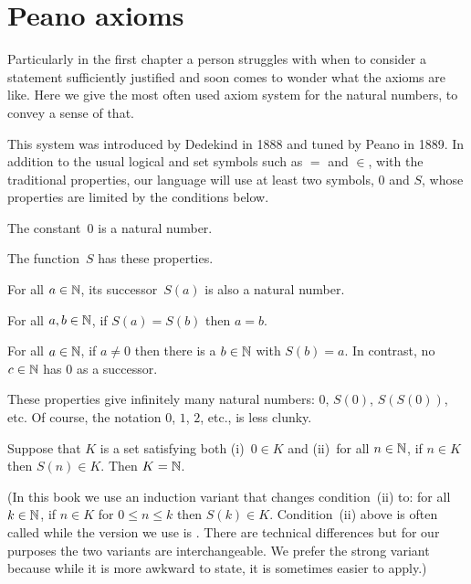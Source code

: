 \appendix
\chapter{Peano axioms}
\newcommand{\axiom}[1]{\textsc{Axiom~#1}\hspace{.5ex}}

Particularly in the 
first chapter a person struggles with when to consider a 
statement sufficiently justified 
and soon comes to wonder what the axioms are like.
Here we give the most often used axiom system for the natural numbers, to
convey a sense of that. 

This system was 
introduced by Dedekind in 1888 and tuned by Peano in 1889.
In addition to the usual logical and set symbols such as $=$ and $\in$,
with the traditional properties, 
our language will use at least two symbols, $0$ and $S$, whose 
properties are limited by the conditions below.

\begin{ax}
The constant~$0$ is a natural number.
\end{ax}

\begin{ax}
The  function~$S$ has these properties.
\begin{exlist}
\item {} For all $a\in\mathbb{N}$, its successor~$S(a)$ is also 
  a natural number.
\item {} For all $a,b\in\mathbb{N}$, if $S(a)=S(b)$ then $a=b$.
\item {}
  For all $a\in\mathbb{N}$, if $a\neq 0$ then there is a $b\in\mathbb{N}$ with $S(b)=a$.
  In contrast, no $c\in\mathbb{N}$ has $0$ as a successor.  
\end{exlist}
\end{ax}

These properties give infinitely many natural numbers:
$0$, $S(0)$, $S(S(0))$, etc.
Of course, the notation $0$, $1$, $2$, etc., is less clunky.

\begin{ax}[Induction]
  Suppose that $K$ is a set satisfying both (i)~$0\in K$
  and (ii)~for all $n\in\mathbb{N}$, if $n\in K$ then $S(n)\in K$.
  Then $K=\mathbb{N}$.
\end{ax}

\noindent (In this book we use an induction variant that changes
condition~(ii) to: for all $k\in\mathbb{N}$,  
if $n\in K$ for $0\leq n\leq k$ then $S(k)\in K$.
Condition~(ii) above is often called  while
the version we use is .
There are technical differences but for our purposes
the two variants are interchangeable. 
We prefer the strong variant because while it is 
more awkward to state, it is sometimes easier to apply.)

